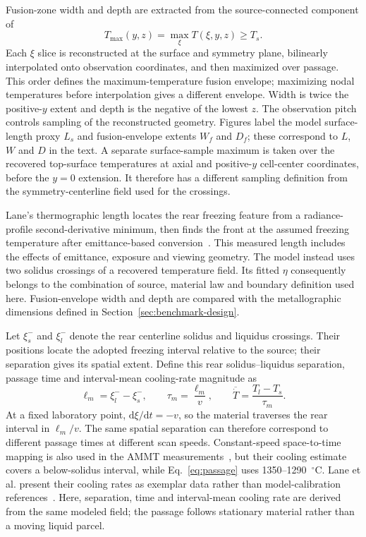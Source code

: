 Fusion-zone width and depth are extracted from the source-connected component of
\begin{equation}
 T_{\max}(y,z)=\max_\xi T(\xi,y,z)\geq T_s.
 \label{eq:fusion}
\end{equation}
Each $\xi$ slice is reconstructed at the surface and symmetry plane, bilinearly interpolated onto observation coordinates, and then maximized over passage. This order defines the maximum-temperature fusion envelope; maximizing nodal temperatures before interpolation gives a different envelope. Width is twice the positive-$y$ extent and depth is the negative of the lowest $z$. The observation pitch controls sampling of the reconstructed geometry. Figures label the model surface-length proxy $L_s$ and fusion-envelope extents $W_f$ and $D_f$; these correspond to $L$, $W$ and $D$ in the text. A separate surface-sample maximum is taken over the recovered top-surface temperatures at axial and positive-$y$ cell-center coordinates, before the $y=0$ extension. It therefore has a different sampling definition from the symmetry-centerline field used for the crossings.

Lane's thermographic length locates the rear freezing feature from a radiance-profile second-derivative minimum, then finds the front at the assumed freezing temperature after emittance-based conversion~\cite{lane2020}. This measured length includes the effects of emittance, exposure and viewing geometry. The model instead uses two solidus crossings of a recovered temperature field. Its fitted $\eta$ consequently belongs to the combination of source, material law and boundary definition used here. Fusion-envelope width and depth are compared with the metallographic dimensions defined in Section~\ref{sec:benchmark-design}.

Let $\xi_s^-$ and $\xi_l^-$ denote the rear centerline solidus and liquidus crossings. Their positions locate the adopted freezing interval relative to the source; their separation gives its spatial extent. Define this rear solidus--liquidus separation, passage time and interval-mean cooling-rate magnitude as
\begin{equation}
 \ell_m=\xi_l^- -\xi_s^-,\qquad
 \tau_m=\frac{\ell_m}{v},\qquad
 \overline{\dot T}=\frac{T_l-T_s}{\tau_m}.
 \label{eq:passage}
\end{equation}
At a fixed laboratory point, $\mathrm d\xi/\mathrm dt=-v$, so the material traverses the rear interval in $\ell_m/v$. The same spatial separation can therefore correspond to different passage times at different scan speeds. Constant-speed space-to-time mapping is also used in the AMMT measurements~\cite{lane2020}, but their cooling estimate covers a below-solidus interval, while Eq.~\eqref{eq:passage} uses 1350--1290~$^\circ$C. Lane et al. present their cooling rates as exemplar data rather than model-calibration references~\cite{lane2020}. Here, separation, time and interval-mean cooling rate are derived from the same modeled field; the passage follows stationary material rather than a moving liquid parcel.

